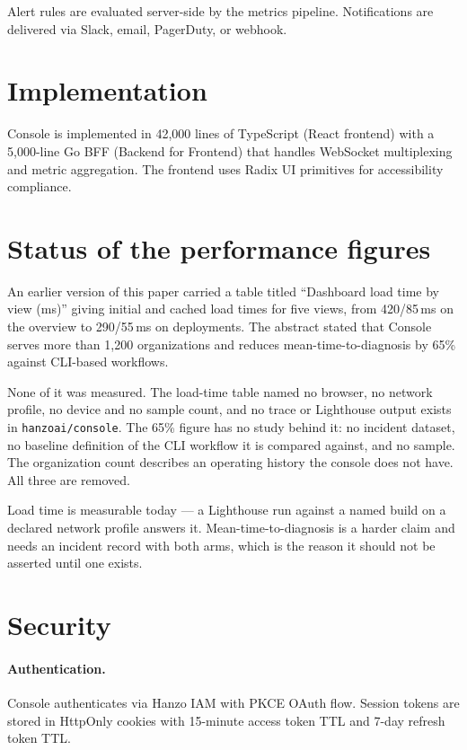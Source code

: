 \documentclass[11pt,twocolumn]{article}
\begin{document}
Alert rules are evaluated server-side by the metrics pipeline. Notifications are delivered via Slack, email, PagerDuty, or webhook.

\section{Implementation}

Console is implemented in 42,000 lines of TypeScript (React frontend) with a 5,000-line Go BFF (Backend for Frontend) that handles WebSocket multiplexing and metric aggregation. The frontend uses Radix UI primitives for accessibility compliance.

\section{Status of the performance figures}
\label{sec:figures}

An earlier version of this paper carried a table titled ``Dashboard load time by
view (ms)'' giving initial and cached load times for five views, from 420/85\,ms
on the overview to 290/55\,ms on deployments. The abstract stated that Console
serves more than 1{,}200 organizations and reduces mean-time-to-diagnosis by
65\% against CLI-based workflows.

None of it was measured. The load-time table named no browser, no network
profile, no device and no sample count, and no trace or Lighthouse output exists
in \texttt{hanzoai/console}. The 65\% figure has no study behind it: no incident
dataset, no baseline definition of the CLI workflow it is compared against, and
no sample. The organization count describes an operating history the console
does not have. All three are removed.

Load time is measurable today --- a Lighthouse run against a named build on a
declared network profile answers it. Mean-time-to-diagnosis is a harder claim
and needs an incident record with both arms, which is the reason it should not
be asserted until one exists.

\section{Security}

\paragraph{Authentication.} Console authenticates via Hanzo IAM with PKCE OAuth flow. Session tokens are stored in HttpOnly cookies with 15-minute access token TTL and 7-day refresh token TTL.
\end{document}
